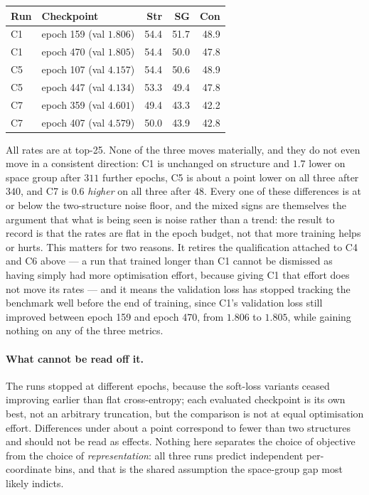 \documentclass[manuscript,screen,review]{acmart}
\begin{document}
\begin{center}
  \begin{footnotesize}
  \begin{tabular}{llrrr}
    \toprule
    Run & Checkpoint & Str & SG & Con \\
    \midrule
    C1 & epoch 159 (val $1.806$) & 54.4 & 51.7 & 48.9 \\
    C1 & epoch 470 (val $1.805$) & 54.4 & 50.0 & 47.8 \\
    \midrule
    C5 & epoch 107 (val $4.157$) & 54.4 & 50.6 & 48.9 \\
    C5 & epoch 447 (val $4.134$) & 53.3 & 49.4 & 47.8 \\
    \midrule
    C7 & epoch 359 (val $4.601$) & 49.4 & 43.3 & 42.2 \\
    C7 & epoch 407 (val $4.579$) & 50.0 & 43.9 & 42.8 \\
    \bottomrule
  \end{tabular}
  \end{footnotesize}
\end{center}

\noindent
All rates are at top-25. None of the three moves materially, and they do not
even move in a consistent direction: C1 is unchanged on structure and $1.7$
lower on space group after $311$ further epochs, C5 is about a point lower on
all three after $340$, and C7 is $0.6$ \emph{higher} on all three after $48$.
Every one of these differences is at or below the two-structure noise floor, and
the mixed signs are themselves the argument that what is being seen is noise
rather than a trend: the result to record is that the rates are flat in the
epoch budget, not that more training helps or hurts. This matters for two
reasons.
It retires the qualification attached to C4 and C6 above --- a run that trained
longer than C1 cannot be dismissed as having simply had more optimisation
effort, because giving C1 that effort does not move its rates --- and it means
the validation loss has stopped tracking the benchmark well before the end of
training, since C1's validation loss still improved between epoch 159 and epoch 470,
from $1.806$ to $1.805$, while gaining nothing on any of the three metrics.

\paragraph{What cannot be read off it.}
The runs stopped at different epochs, because the soft-loss variants ceased
improving earlier than flat cross-entropy; each evaluated checkpoint is its own
best, not an arbitrary truncation, but the comparison is not at equal
optimisation effort. Differences under about a point correspond
to fewer than two structures and should not be read as effects. Nothing here
separates the choice of objective from the choice of \emph{representation}: all
three runs predict independent per-coordinate bins, and that is the shared
assumption the space-group gap most likely indicts.
\end{document}
